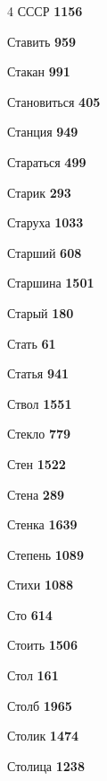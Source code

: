\begin{multicols}{4}
\noindent СССР \dotfill \textbf{\color{secondary} 1156}\par
\noindent Ставить \dotfill \textbf{\color{secondary} 959}\par
\noindent Стакан \dotfill \textbf{\color{secondary} 991}\par
\noindent Становиться \dotfill \textbf{\color{secondary} 405}\par
\noindent Станция \dotfill \textbf{\color{secondary} 949}\par
\noindent Стараться \dotfill \textbf{\color{secondary} 499}\par
\noindent Старик \dotfill \textbf{\color{secondary} 293}\par
\noindent Старуха \dotfill \textbf{\color{secondary} 1033}\par
\noindent Старший \dotfill \textbf{\color{secondary} 608}\par
\noindent Старшина \dotfill \textbf{\color{secondary} 1501}\par
\noindent Старый \dotfill \textbf{\color{secondary} 180}\par
\noindent Стать \dotfill \textbf{\color{secondary} 61}\par
\noindent Статья \dotfill \textbf{\color{secondary} 941}\par
\noindent Ствол \dotfill \textbf{\color{secondary} 1551}\par
\noindent Стекло \dotfill \textbf{\color{secondary} 779}\par
\noindent Стен \dotfill \textbf{\color{secondary} 1522}\par
\noindent Стена \dotfill \textbf{\color{secondary} 289}\par
\noindent Стенка \dotfill \textbf{\color{secondary} 1639}\par
\noindent Степень \dotfill \textbf{\color{secondary} 1089}\par
\noindent Стихи \dotfill \textbf{\color{secondary} 1088}\par
\noindent Сто \dotfill \textbf{\color{secondary} 614}\par
\noindent Стоить \dotfill \textbf{\color{secondary} 1506}\par
\noindent Стол \dotfill \textbf{\color{secondary} 161}\par
\noindent Столб \dotfill \textbf{\color{secondary} 1965}\par
\noindent Столик \dotfill \textbf{\color{secondary} 1474}\par
\noindent Столица \dotfill \textbf{\color{secondary} 1238}\par

\end{multicols}
